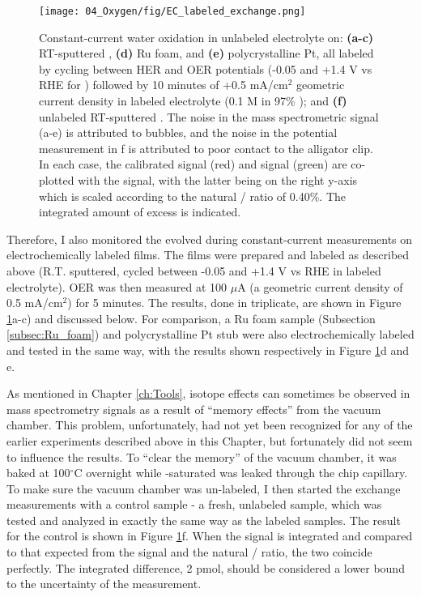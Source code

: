 \begin{figure}[t]
	\centering
	\texttt{[image: 04\_Oxygen/fig/EC\_labeled\_exchange.png]}
	\caption{
		Constant-current water oxidation in unlabeled electrolyte on: \textbf{(a-c)} RT-sputtered , \textbf{(d)} Ru foam, and \textbf{(e)} polycrystalline Pt, all labeled by cycling between HER and OER potentials (-0.05 and +1.4 V vs RHE for ) followed by 10 minutes of +0.5 mA/cm$^2$ geometric current density in labeled electrolyte (0.1 M  in 97\% ); and \textbf{(f)} unlabeled RT-sputtered . The noise in the mass spectrometric signal (a-e) is attributed to bubbles, and the noise in the potential measurement in f is attributed to poor contact to the alligator clip. In each case, the calibrated  signal (red) and  signal (green) are co-plotted with the  signal, with the latter being on the right y-axis which is scaled according to the natural / ratio of 0.40\%. The integrated amount of excess  is indicated. 
	}
	\label{fig:EC_Ru}
\end{figure}

Therefore, I also monitored the  evolved during constant-current measurements on electrochemically labeled  films. The films were prepared and labeled as described above (R.T. sputtered, cycled between -0.05 and +1.4 V vs RHE in labeled electrolyte). OER was then measured at 100 $\mu$A (a geometric current density of 0.5 mA/cm$^2$) for 5 minutes. The results, done in triplicate, are shown in Figure \ref{fig:EC_Ru}a-c) and discussed below. For comparison, a Ru foam sample (Subsection \ref{subsec:Ru_foam}) and polycrystalline Pt stub were also electrochemically labeled and tested in the same way, with the results shown respectively in Figure \ref{fig:EC_Ru}d and e.

As mentioned in Chapter \ref{ch:Tools}, isotope effects can sometimes be observed in mass spectrometry signals as a result of ``memory effects'' from the vacuum chamber. This problem, unfortunately, had not yet been recognized for any of the earlier experiments described above in this Chapter, but fortunately did not seem to influence the results. To ``clear the memory'' of the vacuum chamber, it was baked at 100$^\circ$C overnight while -saturated  was leaked through the chip capillary. To make sure the vacuum chamber was un-labeled, I then started the exchange measurements with a control sample - a fresh, unlabeled  sample, which was tested and analyzed in exactly the same way as the labeled samples. The result for the control is shown in Figure \ref{fig:EC_Ru}f. When the  signal is integrated and compared to that expected from the  signal and the natural / ratio, the two coincide perfectly. The integrated difference, 2 pmol, should be considered a lower bound to the uncertainty of the measurement.

